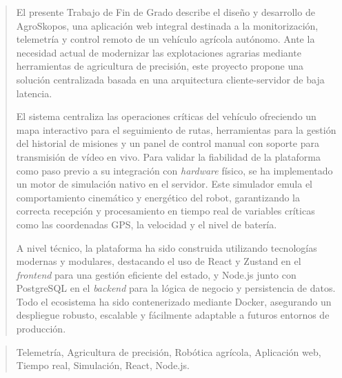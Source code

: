 \documentclass[a4paper,12pt,twoside]{memoir}
\begin{document}
\renewcommand*\abstractname{Resumen}
\begin{abstract}
El presente Trabajo de Fin de Grado describe el diseño y desarrollo de AgroSkopos, una aplicación web integral destinada a la monitorización, telemetría y control remoto de un vehículo agrícola autónomo. Ante la necesidad actual de modernizar las explotaciones agrarias mediante herramientas de agricultura de precisión, este proyecto propone una solución centralizada basada en una arquitectura cliente-servidor de baja latencia.

El sistema centraliza las operaciones críticas del vehículo ofreciendo un mapa interactivo para el seguimiento de rutas, herramientas para la gestión del historial de misiones y un panel de control manual con soporte para transmisión de vídeo en vivo. Para validar la fiabilidad de la plataforma como paso previo a su integración con \textit{hardware} físico, se ha implementado un motor de simulación nativo en el servidor. Este simulador emula el comportamiento cinemático y energético del robot, garantizando la correcta recepción y procesamiento en tiempo real de variables críticas como las coordenadas GPS, la velocidad y el nivel de batería.

A nivel técnico, la plataforma ha sido construida utilizando tecnologías modernas y modulares, destacando el uso de React y Zustand en el \textit{frontend} para una gestión eficiente del estado, y Node.js junto con PostgreSQL en el \textit{backend} para la lógica de negocio y persistencia de datos. Todo el ecosistema ha sido contenerizado mediante Docker, asegurando un despliegue robusto, escalable y fácilmente adaptable a futuros entornos de producción.
\end{abstract}

\renewcommand*\abstractname{Descriptores}
\begin{abstract}
Telemetría, Agricultura de precisión, Robótica agrícola, Aplicación web, Tiempo real, Simulación, React, Node.js.
\end{abstract}

\clearpage
\end{document}
